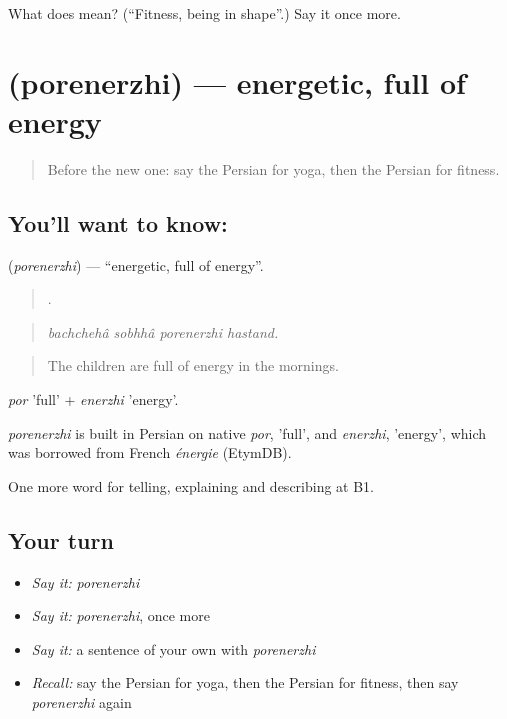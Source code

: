 \begin{tcolorbox}[breakable,colback=teal!4,colframe=teal!35!black,title={Before you move on}]
What does   mean? (\textquotedblleft{}Fitness, being in shape\textquotedblright{}.) Say it once more.
\end{tcolorbox}
\section[\texorpdfstring{\fa{پرانرژی} (porenerzhi)}{پرانرژی (porenerzhi)}]{ (porenerzhi) — energetic, full of energy}

\label{lesson:FA-C516-porenerzhi}



\begin{quote}
Before the new one: say the Persian for yoga, then the Persian for fitness.
\end{quote}

\subsection*{You'll want to know: }
\textbf{} (\emph{porenerzhi}) — \textquotedblleft{}energetic, full of energy\textquotedblright{}.

\begin{quote}
    .
\end{quote}

\begin{quote}
\emph{bachchehâ sobhhâ porenerzhi hastand.}
\end{quote}

\begin{quote}
The children are full of energy in the mornings.
\end{quote}

\emph{por} 'full' + \emph{enerzhi} 'energy'.

\begin{cousinweb}
\emph{porenerzhi} is built in Persian on native \emph{por}, 'full', and \emph{enerzhi}, 'energy', which was borrowed from French \emph{énergie} (EtymDB).
\end{cousinweb}

\begin{grammarlens}[title={What you've built}]
One more word for telling, explaining and describing at B1.
\end{grammarlens}

\subsection*{Your turn}
\begin{itemize}
\raggedright
  \item \emph{Say it:} \emph{porenerzhi}
  \item \emph{Say it:} \emph{porenerzhi}, once more
  \item \emph{Say it:} a sentence of your own with \emph{porenerzhi}
  \item \emph{Recall:} say the Persian for yoga, then the Persian for fitness, then say \emph{porenerzhi} again
\end{itemize}

